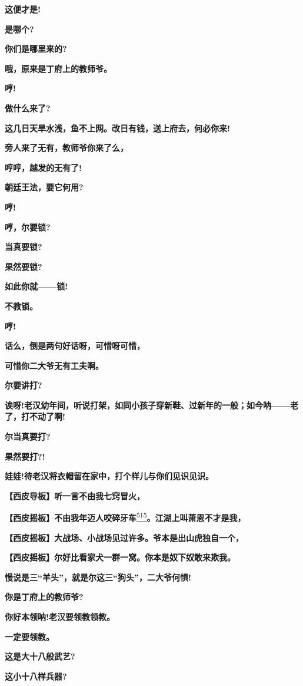 \textbf{这便才是!}

\textbf{是哪个?}

\textbf{你们是哪里来的?}

\textbf{哦，原来是丁府上的教师爷。}

\textbf{哼!}

\textbf{做什么来了?}

\textbf{这几日天旱水浅，鱼不上网。改日有钱，送上府去，何必你来!}

\textbf{旁人来了无有，教师爷你来了么，}

\textbf{哼哼，越发的无有了!}

\textbf{朝廷王法，要它何用?}

\textbf{哼!}

\textbf{哼，尔要锁?}

\textbf{当真要锁?}

\textbf{果然要锁?}

\textbf{如此你就------锁!}

\textbf{不教锁。}

\textbf{哼!}

\textbf{话么，倒是两句好话呀，可惜呀可惜，}

\textbf{可惜你二大爷无有工夫啊。}

\textbf{尔要讲打?}

\textbf{诶呀!老汉幼年间，听说打架，如同小孩子穿新鞋、过新年的一般；如今呐------老了，打不动了啊!}

\textbf{尔当真要打?}

\textbf{果然要打?!}

\textbf{娃娃!待老汉将衣帽留在家中，打个样儿与你们见识见识。}

\textbf{【西皮导板】听一言不由我七窍冒火，}

\textbf{【西皮摇板】不由我年迈人咬碎牙车}\protect\hyperlink{fn515}{\textsuperscript{515}}\textbf{。江湖上叫萧恩不才是我，}

\textbf{【西皮摇板】大战场、小战场见过许多。爷本是出山虎独自一个，}

\textbf{【西皮摇板】尔好比看家犬一群一窝。你本是奴下奴敢来欺我。}

\textbf{慢说是三``羊头''，就是尔这三``狗头''，二大爷何惧!}

\textbf{你是丁府上的教师爷?}

\textbf{你好本领呐!老汉要领教领教。}

\textbf{一定要领教。}

\textbf{这是大十八般武艺?}

\textbf{这小十八样兵器?}


